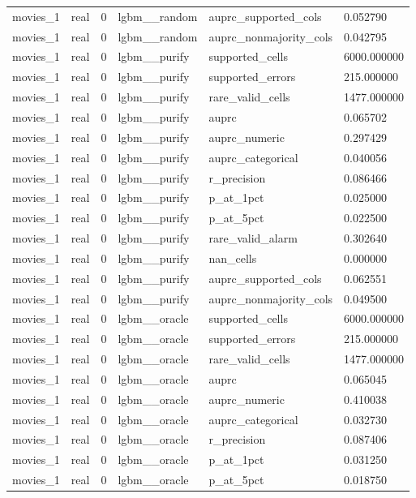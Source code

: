 \begin{tabular}{llllll}
movies\_1 & real & 0 & lgbm\_\_random & auprc\_supported\_cols & 0.052790 \\
movies\_1 & real & 0 & lgbm\_\_random & auprc\_nonmajority\_cols & 0.042795 \\
movies\_1 & real & 0 & lgbm\_\_purify & supported\_cells & 6000.000000 \\
movies\_1 & real & 0 & lgbm\_\_purify & supported\_errors & 215.000000 \\
movies\_1 & real & 0 & lgbm\_\_purify & rare\_valid\_cells & 1477.000000 \\
movies\_1 & real & 0 & lgbm\_\_purify & auprc & 0.065702 \\
movies\_1 & real & 0 & lgbm\_\_purify & auprc\_numeric & 0.297429 \\
movies\_1 & real & 0 & lgbm\_\_purify & auprc\_categorical & 0.040056 \\
movies\_1 & real & 0 & lgbm\_\_purify & r\_precision & 0.086466 \\
movies\_1 & real & 0 & lgbm\_\_purify & p\_at\_1pct & 0.025000 \\
movies\_1 & real & 0 & lgbm\_\_purify & p\_at\_5pct & 0.022500 \\
movies\_1 & real & 0 & lgbm\_\_purify & rare\_valid\_alarm & 0.302640 \\
movies\_1 & real & 0 & lgbm\_\_purify & nan\_cells & 0.000000 \\
movies\_1 & real & 0 & lgbm\_\_purify & auprc\_supported\_cols & 0.062551 \\
movies\_1 & real & 0 & lgbm\_\_purify & auprc\_nonmajority\_cols & 0.049500 \\
movies\_1 & real & 0 & lgbm\_\_oracle & supported\_cells & 6000.000000 \\
movies\_1 & real & 0 & lgbm\_\_oracle & supported\_errors & 215.000000 \\
movies\_1 & real & 0 & lgbm\_\_oracle & rare\_valid\_cells & 1477.000000 \\
movies\_1 & real & 0 & lgbm\_\_oracle & auprc & 0.065045 \\
movies\_1 & real & 0 & lgbm\_\_oracle & auprc\_numeric & 0.410038 \\
movies\_1 & real & 0 & lgbm\_\_oracle & auprc\_categorical & 0.032730 \\
movies\_1 & real & 0 & lgbm\_\_oracle & r\_precision & 0.087406 \\
movies\_1 & real & 0 & lgbm\_\_oracle & p\_at\_1pct & 0.031250 \\
movies\_1 & real & 0 & lgbm\_\_oracle & p\_at\_5pct & 0.018750 \\

\end{tabular}
